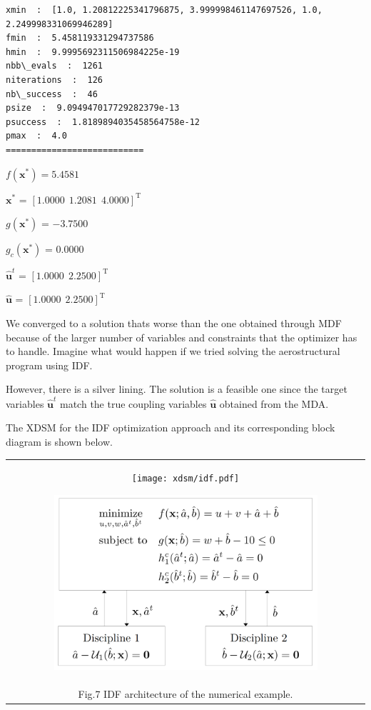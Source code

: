 \documentclass[11pt]{article}
\begin{document}
    \begin{Verbatim}[commandchars=\\\{\}]
xmin  :  [1.0, 1.20812225341796875, 3.999998461147697526, 1.0,
2.249998331069946289]
fmin  :  5.458119331294737586
hmin  :  9.9995692311506984225e-19
nbb\_evals  :  1261
niterations  :  126
nb\_success  :  46
psize  :  9.094947017729282379e-13
psuccess  :  1.8189894035458564758e-12
pmax  :  4.0
===========================
    \end{Verbatim}

    $f(\mathbf{x}^*) = 5.4581$

    
    $\mathbf{x}^*$ = $[1.0000~~1.2081~~4.0000]^\mathrm{T}$

    
    $g(\mathbf{x}^*)$ = $-3.7500$

    
    $g_c(\mathbf{x}^*)$ = $0.0000$

    
    $\hat{\mathbf{u}}^t$ = $[1.0000~~2.2500]^\mathrm{T}$

    
    $\hat{\mathbf{u}}$ = $[1.0000~~2.2500]^\mathrm{T}$

    
    We converged to a solution thats worse than the one obtained through MDF
because of the larger number of variables and constraints that the
optimizer has to handle. Imagine what would happen if we tried solving
the aerostructural program using IDF.

However, there is a silver lining. The solution is a feasible one since
the target variables \(\hat{\mathbf{u}}^t\) match the true coupling
variables \(\hat{\mathbf{u}}\) obtained from the MDA.

The XDSM for the IDF optimization approach and its corresponding block
diagram is shown below.

\begin{longtable}[]{@{}c@{}}
    \toprule
    \endhead
    \begin{minipage}[t]{0.97\columnwidth}\centering
        \begin{figure}
            \centering
            \texttt{[image: xdsm/idf.pdf]}
        \end{figure}
        \begin{figure}
            \centering
            \includegraphics[width=0.9\textwidth]{images/IDF_diagram_numerical.png}
        \end{figure}
    \end{minipage}\tabularnewline
    Fig.7 IDF architecture of the numerical example.\tabularnewline
    \bottomrule
\end{longtable}
\end{document}
